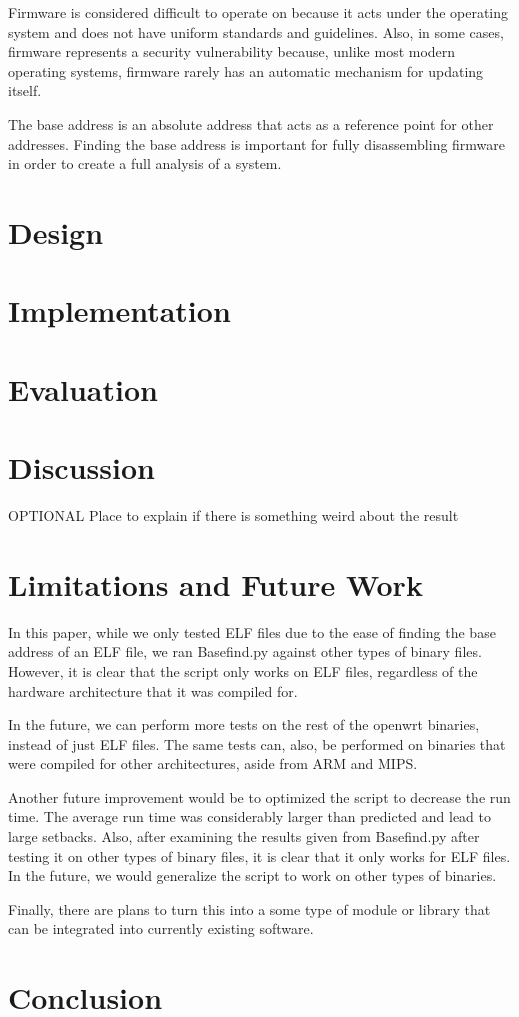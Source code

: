 \documentclass[letterpaper,twocolumn,10pt]{article}
\begin{document}
Firmware is considered difficult to operate on because it acts under the operating system and does not have uniform standards and guidelines. Also, in some cases, firmware represents a security vulnerability because, unlike most modern operating systems, firmware rarely has an automatic mechanism for updating itself\cite{firmwaresecurity2014}. 

The base address is an absolute address that acts as a reference point for other addresses. Finding the base address is important for fully disassembling firmware in order to create a full analysis of a system. 

\section{Design}

\section{Implementation}

\section{Evaluation}

\section{Discussion}
OPTIONAL
Place to explain if there is something weird about the result

\section{Limitations and Future Work}
In this paper, while we only tested ELF files due to the ease of finding the base address of an ELF file, we ran Basefind.py against other types of binary files. However, it is clear that the script only works on ELF files, regardless of the hardware architecture that it was compiled for. 

In the future, we can perform more tests on the rest of the openwrt binaries, instead of just ELF files. The same tests can, also, be performed on binaries that were compiled for other architectures, aside from ARM and MIPS. 

Another future improvement would be to optimized the script to decrease the run time. The average run time was considerably larger than predicted and lead to large setbacks. Also, after examining the results given from Basefind.py after testing it on other types of binary files, it is clear that it only works for ELF files. In the future, we would generalize the script to work on other types of binaries. 

Finally, there are plans to turn this into a some type of module or library that can be integrated into currently existing software. 

\section{Conclusion}



\end{document}

